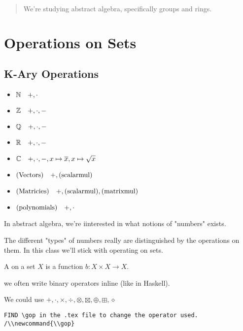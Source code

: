 \documentclass[12pt]{article}
\begin{document}
\maketitle 

\begin{abstract}
  We're studying abstract algebra, specifically groups and rings.
\end{abstract}

\tableofcontents

\pagebreak

\section{Operations on Sets}
\subsection{K-Ary Operations}

\begin{itemize}
  \item \(\mathbb N\quad +,\cdot\)
  \item \(\mathbb Z\quad +,\cdot,-\)
  \item \(\mathbb Q\quad +,\cdot,-\)
  \item \(\mathbb R\quad +,\cdot,-\)
  \item \(\mathbb C\quad +,\cdot,-,x\mapsto\overline x,x\mapsto\sqrt x\)
  \item \((\mathrm{Vectors})\quad +,(\mathrm{scalar mul})\)
  \item \((\mathrm{Matricies})\quad +,(\mathrm{scalar mul}),(\mathrm{matrix mul})\)
  \item \((\mathrm{polynomials})\quad +,\cdot\)
\end{itemize}

In abstract algebra, we're iinterested in what notions of "numbers" exists.

The different "types" of numbers really are distinguished by the operations on
them. In this class we'll stick with operating on sets.

\bbox
\begin{defn}
  A  on a set \(X\) is a function \(b:X\times X\to X\).
\end{defn}
\ebox
\bboxnote
{} we often write binary operators inline (like in Haskell).
\ebox

We could use \(+,\cdot,\times,\div,\otimes,\boxtimes,\oplus,\boxplus,\diamond\)
\begin{verbatim}
FIND \gop in the .tex file to change the operator used. 
/\\newcommand{\\gop}
\end{verbatim}
\end{document}
